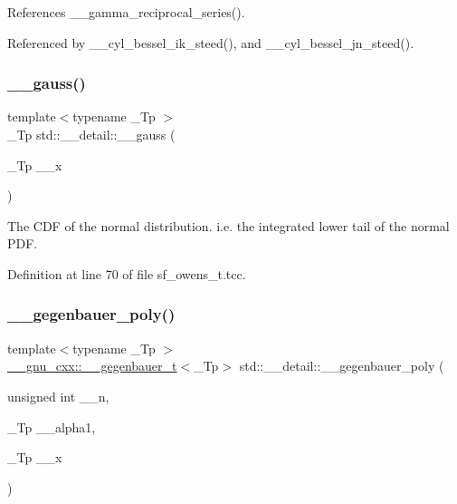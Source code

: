 References \+\_\+\+\_\+gamma\+\_\+reciprocal\+\_\+series().



Referenced by \+\_\+\+\_\+cyl\+\_\+bessel\+\_\+ik\+\_\+steed(), and \+\_\+\+\_\+cyl\+\_\+bessel\+\_\+jn\+\_\+steed().

\mbox{\label{namespacestd_1_1____detail_afdb25beb2328b74d64d9be03de64c442}} 
\subsubsection{\texorpdfstring{\+\_\+\+\_\+gauss()}{\_\_gauss()}}
{\footnotesize\ttfamily template$<$typename \+\_\+\+Tp $>$ \\
\+\_\+\+Tp std\+::\+\_\+\+\_\+detail\+::\+\_\+\+\_\+gauss (\begin{DoxyParamCaption}\item[{\+\_\+\+Tp}]{\+\_\+\+\_\+x }\end{DoxyParamCaption})}

The C\+DF of the normal distribution. i.\+e. the integrated lower tail of the normal P\+DF. 

Definition at line 70 of file sf\+\_\+owens\+\_\+t.\+tcc.

\mbox{\label{namespacestd_1_1____detail_a95571fd8bb2ab2400136ab368a858963}} 
\subsubsection{\texorpdfstring{\+\_\+\+\_\+gegenbauer\+\_\+poly()}{\_\_gegenbauer\_poly()}}
{\footnotesize\ttfamily template$<$typename \+\_\+\+Tp $>$ \\
\hyperlink{struct____gnu__cxx_1_1____gegenbauer__t}{\+\_\+\+\_\+gnu\+\_\+cxx\+::\+\_\+\+\_\+gegenbauer\+\_\+t}$<$\+\_\+\+Tp$>$ std\+::\+\_\+\+\_\+detail\+::\+\_\+\+\_\+gegenbauer\+\_\+poly (\begin{DoxyParamCaption}\item[{unsigned int}]{\+\_\+\+\_\+n,  }\item[{\+\_\+\+Tp}]{\+\_\+\+\_\+alpha1,  }\item[{\+\_\+\+Tp}]{\+\_\+\+\_\+x }\end{DoxyParamCaption})}


